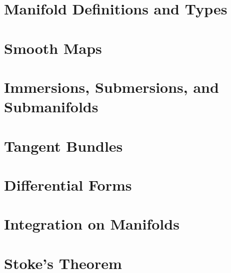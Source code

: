 \documentclass[12pt]{report}
\begin{document}
\chapter{Manifold Definitions and Types}


\chapter{Smooth Maps}



\chapter{Immersions, Submersions, and Submanifolds}



\chapter{Tangent Bundles}


\chapter{Differential Forms}



\chapter{Integration on Manifolds}



\chapter{Stoke's Theorem}
\end{document}
